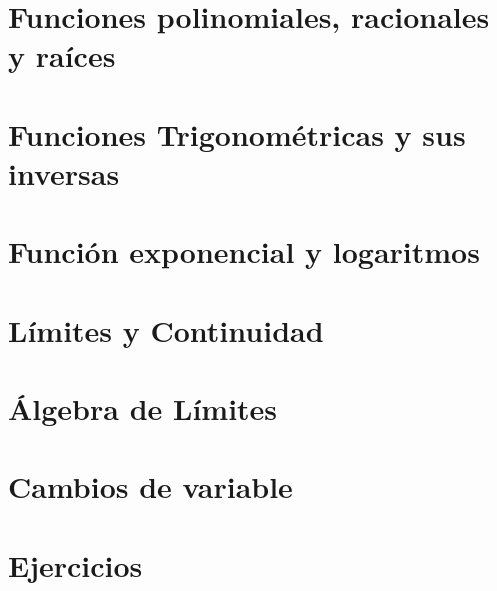 \documentclass[11pt, twoside]{memoir}
\begin{document}
\section{Funciones polinomiales, racionales y raíces}
\section{Funciones Trigonométricas y sus inversas}
\section{Función exponencial y logaritmos}
\section{Límites y Continuidad}
\section{Álgebra de Límites}
\section{Cambios de variable}
\section{Ejercicios}

\printbibliography%
\printindex

%
%

\nopagecolor
\end{document}
